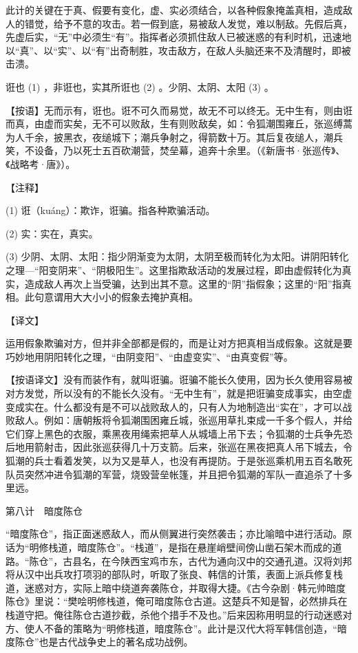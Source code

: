 \documentclass[12pt,UTF8]{ctexbook}
\begin{document}
此计的关键在于真、假要有变化，虚、实必须结合，以各种假象掩盖真相，造成敌人的错觉，给予不意的攻击。若一假到底，易被敌人发觉，难以制敌。先假后真，先虚后实，“无”中必须生“有”。指挥者必须抓住敌人已被迷惑的有利时机，迅速地以“真”、以“实”、以“有”出奇制胜，攻击敌方，在敌人头脑还来不及清醒时，即被击溃。





诳也 (1) ，非诳也，实其所诳也 (2) 。少阴、太阴、太阳 (3) 。

【按语】无而示有，诳也。诳不可久而易觉，故无不可以终无。无中生有，则由诳而真，由虚而实矣，无不可以败敌，生有则败敌矣，如：令狐潮围雍丘，张巡缚蒿为人千余，披黑衣，夜缒城下；潮兵争射之，得箭数十万。其后复夜缒人，潮兵笑，不设备，乃以死士五百砍潮营，焚垒幕，追奔十余里。（《新唐书·张巡传》、《战略考·唐》）。





【注释】


(1) 诳（kuáng）：欺诈，诳骗。指各种欺骗活动。

(2) 实：实在，真实。

(3) 少阴、太阴、太阳：指少阴渐变为太阴，太阴至极而转化为太阳。讲阴阳转化之理—“阳变阴来”、“阴极阳生”。这里指欺敌活动的发展过程，即由虚假转化为真实，造成敌人再次上当受骗，达到出其不意。这里的“阴”指假象；这里的“阳”指真相。此句意谓用大大小小的假象去掩护真相。





【译文】


运用假象欺骗对方，但并非全部都是假的，而是让对方把真相当成假象。这就是要巧妙地用阴阳转化之理，“由阴变阳”、“由虚变实”、“由真变假”等。

【按语译文】没有而装作有，就叫诳骗。诳骗不能长久使用，因为长久使用容易被对方发觉，所以没有的不能长久没有。“无中生有”，就是把诳骗变成事实，由空虚变成实在。什么都没有是不可以战败敌人的，只有人为地制造出“实在”，才可以战败敌人。例如：唐朝叛将令狐潮围困雍丘城，张巡用草扎束成一千多个假人，并给它们穿上黑色的衣服，乘黑夜用绳索把草人从城墙上吊下去；令狐潮的士兵争先恐后地用箭射击，因此张巡获得几十万支箭。后来，张巡在黑夜把真人吊下城去，令狐潮的兵士看着发笑，以为又是草人，也没有再提防。于是张巡乘机用五百名敢死队员突然冲进令狐潮的军营，烧毁营垒帐篷，并且把令狐潮的军队一直追杀了十多里远。





第八计　暗度陈仓


“暗度陈仓”，指正面迷惑敌人，而从侧翼进行突然袭击；亦比喻暗中进行活动。原话为“明修栈道，暗度陈仓”。“栈道”，是指在悬崖峭壁间傍山凿石架木而成的道路。“陈仓”，古县名，在今陕西宝鸡市东，古代为通向汉中的交通孔道。汉将刘邦将从汉中出兵攻打项羽的部队时，听取了张良、韩信的计策，表面上派兵修复栈道，迷惑对方，实际上暗中绕道奔袭陈仓，并取得大捷。《古今杂剧·韩元帅暗度陈仓》里说：“樊哙明修栈道，俺可暗度陈仓古道。这楚兵不知是智，必然排兵在栈道守把。俺往陈仓古道抄截，杀他个措手不及也。”后来因称用明显的行动迷惑对方、使人不备的策略为“明修栈道，暗度陈仓”。此计是汉代大将军韩信创造，“暗度陈仓”也是古代战争史上的著名成功战例。
\end{document}
